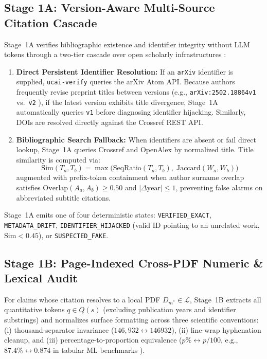 \documentclass[10pt,twocolumn]{article}
\begin{document}
\subsection{Stage 1A: Version-Aware Multi-Source Citation Cascade}
Stage~1A verifies bibliographic existence and identifier integrity without LLM tokens through a two-tier cascade over open scholarly infrastructures \cite{hendricks2020crossref,priem2022openalex,kinney2025s2ag}:
\begin{enumerate}
  \item \textbf{Direct Persistent Identifier Resolution:} If an \texttt{arXiv} identifier is supplied, \texttt{ucai-verify} queries the arXiv Atom API. Because authors frequently revise preprint titles between versions (e.g., \texttt{arXiv:2502.18864v1} vs.\ \texttt{v2} \cite{gottweis2025coscientist}), if the latest version exhibits title divergence, Stage~1A automatically queries \texttt{v1} before diagnosing identifier hijacking. Similarly, DOIs are resolved directly against the Crossref REST API.
  \item \textbf{Bibliographic Search Fallback:} When identifiers are absent or fail direct lookup, Stage~1A queries Crossref and OpenAlex by normalized title. Title similarity is computed via:
  \begin{equation}
    \mathrm{Sim}(T_a, T_b) = \max\!\big(\mathrm{SeqRatio}(T_a, T_b),\; \mathrm{Jaccard}(W_a, W_b)\big)
  \end{equation}
  augmented with prefix-token containment when author surname overlap satisfies $\mathrm{Overlap}(A_a, A_b) \ge 0.50$ and $|\Delta\text{year}| \le 1$, preventing false alarms on abbreviated subtitle citations.
\end{enumerate}
Stage~1A emits one of four deterministic states: \texttt{VERIFIED\_EXACT}, \texttt{METADATA\_DRIFT}, \texttt{IDENTIFIER\_HIJACKED} (valid ID pointing to an unrelated work, $\mathrm{Sim} < 0.45$), or \texttt{SUSPECTED\_FAKE}.

\subsection{Stage 1B: Page-Indexed Cross-PDF Numeric \& Lexical Audit}
For claims whose citation resolves to a local PDF $D_{m^*} \in \mathcal{L}$, Stage~1B extracts all quantitative tokens $q \in Q(s)$ (excluding publication years and identifier substrings) and normalizes surface formatting across three scientific conventions: (i) thousand-separator invariance ($146{,}932 \leftrightarrow 146932$), (ii) line-wrap hyphenation cleanup, and (iii) percentage-to-proportion equivalence ($p\% \leftrightarrow p/100$, e.g., $87.4\% \leftrightarrow 0.874$ in tabular ML benchmarks \cite{chen2025mlrbench}).
\end{document}

